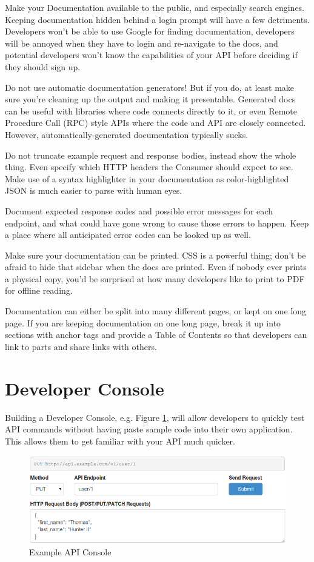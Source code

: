 \documentclass{book}
\begin{document}
Make your Documentation available to the public, and especially search engines. Keeping documentation hidden behind a login prompt will have a few detriments. Developers won't be able to use Google for finding documentation, developers will be annoyed when they have to login and re-navigate to the docs, and potential developers won't know the capabilities of your API before deciding if they should sign up.

Do not use automatic documentation generators! But if you do, at least make sure you're cleaning up the output and making it presentable. Generated docs can be useful with libraries where code connects directly to it, or even Remote Procedure Call (RPC) style APIs where the code and API are closely connected. However, automatically-generated documentation typically sucks.

Do not truncate example request and response bodies, instead show the whole thing. Even specify which HTTP headers the Consumer should expect to see. Make use of a syntax highlighter in your documentation as color-highlighted JSON is much easier to parse with human eyes.

Document expected response codes and possible error messages for each endpoint, and what could have gone wrong to cause those errors to happen. Keep a place where all anticipated error codes can be looked up as well.

Make sure your documentation can be printed. CSS is a powerful thing; don't be afraid to hide that sidebar when the docs are printed. Even if nobody ever prints a physical copy, you'd be surprised at how many developers like to print to PDF for offline reading.

Documentation can either be split into many different pages, or kept on one long page. If you are keeping documentation on one long page, break it up into sections with anchor tags and provide a Table of Contents so that developers can link to parts and share links with others.


\section{Developer Console}

Building a Developer Console, e.g. Figure \ref{fig:devconsole}, will allow developers to quickly test API commands without having paste sample code into their own application. This allows them to get familiar with your API much quicker.

\begin{figure}[ht!]
\centering
\includegraphics[width=120mm]{images/api-console.png}
\caption{Example API Console}
\label{fig:devconsole}
\end{figure}
\end{document}
